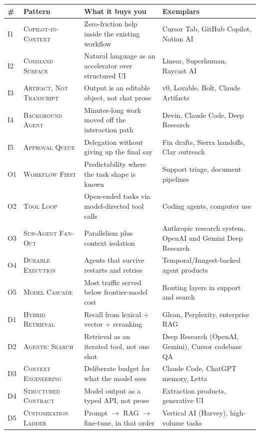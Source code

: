 \documentclass[11pt]{article}
\newcommand{\pat}[1]{\textsc{#1}}
\begin{document}
\begin{table}[tbp]
\centering
\small
\begin{tabular}{@{}l L{3.3cm} L{5.4cm} L{4.3cm}@{}}
\toprule
\# & Pattern & What it buys you & Exemplars \\
\midrule
I1 & \pat{Copilot-in-Context} & Zero-friction help inside the existing workflow & Cursor Tab, GitHub Copilot, Notion AI \\
I2 & \pat{Command Surface} & Natural language as an accelerator over structured UI & Linear, Superhuman, Raycast AI \\
I3 & \pat{Artifact, Not Transcript} & Output is an editable object, not chat prose & v0, Lovable, Bolt, Claude Artifacts \\
I4 & \pat{Background Agent} & Minutes-long work moved off the interaction path & Devin, Claude Code, Deep Research \\
I5 & \pat{Approval Queue} & Delegation without giving up the final say & Fin drafts, Sierra handoffs, Clay outreach \\
\midrule
O1 & \pat{Workflow First} & Predictability where the task shape is known & Support triage, document pipelines \\
O2 & \pat{Tool Loop} & Open-ended tasks via model-directed tool calls & Coding agents, computer use \\
O3 & \pat{Sub-Agent Fan-Out} & Parallelism plus context isolation & Anthropic research system, OpenAI and Gemini Deep Research \\
O4 & \pat{Durable Execution} & Agents that survive restarts and retries & Temporal/Inngest-backed agent products \\
O5 & \pat{Model Cascade} & Most traffic served below frontier-model cost & Routing layers in support and search \\
\midrule
D1 & \pat{Hybrid Retrieval} & Recall from lexical + vector + reranking & Glean, Perplexity, enterprise RAG \\
D2 & \pat{Agentic Search} & Retrieval as an iterated tool, not one shot & Deep Research (OpenAI, Gemini), Cursor codebase QA \\
D3 & \pat{Context Engineering} & Deliberate budget for what the model sees & Claude Code, ChatGPT memory, Letta \\
D4 & \pat{Structured Contract} & Model output as a typed API, not prose & Extraction products, generative UI \\
D5 & \pat{Customization Ladder} & Prompt \(\to\) RAG \(\to\) fine-tune, in that order & Vertical AI (Harvey), high-volume tasks \\

\end{tabular}
\end{table}
\end{document}
